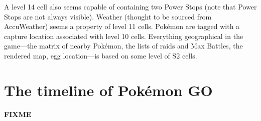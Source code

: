 A level 14 cell also seems capable of containing two Power Stops (note that Power Stops are not always visible).
 Weather (thought to be sourced from AccuWeather) seems a property of level 11 cells.
Pokémon are tagged with a capture location associated with level 10 cells.
Everything geographical in the game---the matrix of nearby Pokémon, the lists
 of raids and Max Battles, the rendered map, egg location---is based on some level of S2 cells.

\section{The timeline of Pokémon GO\label{sec:timeline}}
\textbf{FIXME}
